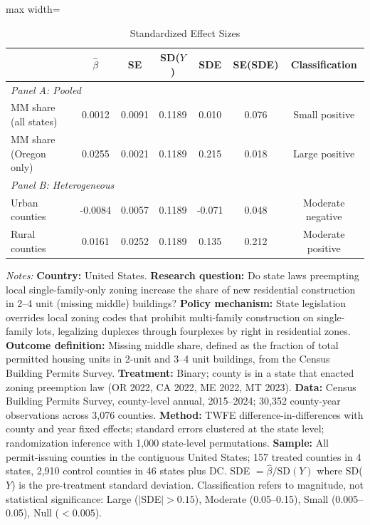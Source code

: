 \begin{table}[htbp]
\centering
\caption{Standardized Effect Sizes}
\label{tab:sde}
\begin{threeparttable}
\begin{adjustbox}{max width=\textwidth}
\small
\begin{tabular}{lcccccc}
\hline\hline
 & $\hat{\beta}$ & SE & SD($Y$) & SDE & SE(SDE) & Classification \\
\hline
\multicolumn{7}{l}{\textit{Panel A: Pooled}} \\
MM share (all states) & 0.0012 & 0.0091 & 0.1189 & 0.010 & 0.076 & Small positive \\
MM share (Oregon only) & 0.0255 & 0.0021 & 0.1189 & 0.215 & 0.018 & Large positive \\
\hline
\multicolumn{7}{l}{\textit{Panel B: Heterogeneous}} \\
Urban counties & -0.0084 & 0.0057 & 0.1189 & -0.071 & 0.048 & Moderate negative \\
Rural counties & 0.0161 & 0.0252 & 0.1189 & 0.135 & 0.212 & Moderate positive \\
\hline\hline
\end{tabular}
\end{adjustbox}
\begin{tablenotes}[flushleft]\footnotesize
\item \textit{Notes:} \textbf{Country:} United States. \textbf{Research question:} Do state laws preempting local single-family-only zoning increase the share of new residential construction in 2--4 unit (missing middle) buildings? \textbf{Policy mechanism:} State legislation overrides local zoning codes that prohibit multi-family construction on single-family lots, legalizing duplexes through fourplexes by right in residential zones. \textbf{Outcome definition:} Missing middle share, defined as the fraction of total permitted housing units in 2-unit and 3--4 unit buildings, from the Census Building Permits Survey. \textbf{Treatment:} Binary; county is in a state that enacted zoning preemption law (OR 2022, CA 2022, ME 2022, MT 2023). \textbf{Data:} Census Building Permits Survey, county-level annual, 2015--2024; 30,352 county-year observations across 3,076 counties. \textbf{Method:} TWFE difference-in-differences with county and year fixed effects; standard errors clustered at the state level; randomization inference with 1,000 state-level permutations. \textbf{Sample:} All permit-issuing counties in the contiguous United States; 157 treated counties in 4 states, 2,910 control counties in 46 states plus DC. SDE $= \hat{\beta} / \text{SD}(Y)$ where SD($Y$) is the pre-treatment standard deviation. Classification refers to magnitude, not statistical significance: Large ($|$SDE$| > 0.15$), Moderate (0.05--0.15), Small (0.005--0.05), Null ($< 0.005$).
\end{tablenotes}
\end{threeparttable}
\end{table}

